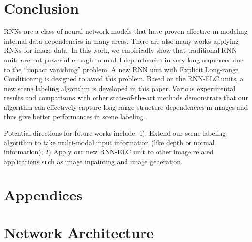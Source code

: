 \documentclass[10pt,twocolumn,letterpaper]{article}
\begin{document}





\section{Conclusion}
RNNs are a class of neural network models that have proven effective in modeling internal data dependencies in many areas. There are also many works applying RNNs for image data. In this work, we empirically show that traditional RNN units are not powerful enough to model dependencies in very long sequences due to the ``impact vanishing'' problem. A new RNN unit with Explicit Long-range Conditioning is designed to avoid this problem. Based on the RNN-ELC units, a new scene labeling algorithm is developed in this paper. Various experimental results and comparisons with other state-of-the-art methods demonstrate that our algorithm can effectively capture long range structure dependencies in images and thus give better performances in scene labeling.

Potential directions for future works include: 1). Extend our scene labeling algorithm to take multi-modal input information (like depth or normal information); 2) Apply our new RNN-ELC unit to other image related applications such as image inpainting and image generation.



\appendix
{}
\section*{Appendices}
\section{Network Architecture}
\end{document}
